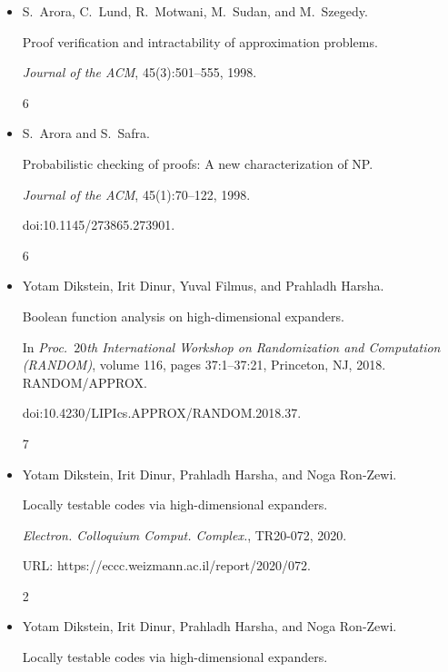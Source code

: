 \documentclass[10pt,a4paper]{article}
\begin{document}
\begin{itemize}


\item[] 
[1]

S. Arora, C. Lund, R. Motwani, M. Sudan, and M. Szegedy.


Proof verification and intractability of approximation problems.


\emph{Journal of the ACM}, 45(3):501–555, 1998.


6




\item[] 
[2]

S. Arora and S. Safra.


Probabilistic checking of proofs: A new characterization of NP.


\emph{Journal of the ACM}, 45(1):70–122, 1998.


doi:10.1145/273865.273901.


6




\item[] 
[3]

Yotam Dikstein, Irit Dinur, Yuval Filmus, and Prahladh Harsha.


Boolean function analysis on high-dimensional expanders.


In \emph{Proc. $20$th International Workshop on Randomization and
Computation (RANDOM)}, volume 116, pages 37:1–37:21, Princeton, NJ, 2018.
RANDOM/APPROX.


doi:10.4230/LIPIcs.APPROX/RANDOM.2018.37.


7




\item[] 
[4]

Yotam Dikstein, Irit Dinur, Prahladh Harsha, and Noga Ron-Zewi.


Locally testable codes via high-dimensional expanders.


\emph{Electron. Colloquium Comput. Complex.}, TR20-072, 2020.


URL: https://eccc.weizmann.ac.il/report/2020/072.


2




\item[] 
[5]

Yotam Dikstein, Irit Dinur, Prahladh Harsha, and Noga Ron-Zewi.


Locally testable codes via high-dimensional expanders.



\end{itemize}
\end{document}
